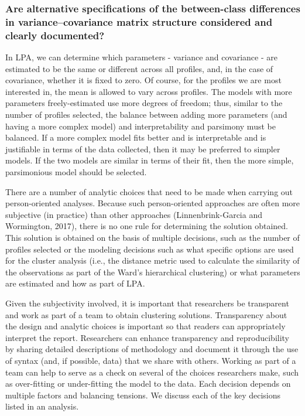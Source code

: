 \documentclass[man]{apa6}
\begin{document}
\hypertarget{are-alternative-specifications-of-the-between-class-differences-in-variancecovariance-matrix-structure-considered-and-clearly-documented}{%
\subsubsection{Are alternative specifications of the between-class differences in variance--covariance matrix structure considered and clearly documented?}\label{are-alternative-specifications-of-the-between-class-differences-in-variancecovariance-matrix-structure-considered-and-clearly-documented}}

In LPA, we can determine which parameters - variance
and covariance - are estimated to be the same or different across all profiles,
and, in the case of covariance, whether it is fixed to zero. Of course, for the
profiles we are most interested in, the mean is allowed to vary across profiles.
The models with more parameters freely-estimated use more degrees of freedom;
thus, similar to the number of profiles selected, the balance between adding
more parameters (and having a more complex model) and interpretability and
parsimony must be balanced. If a more complex model fits better and is
interpretable and is justifiable in terms of the data collected, then it may be
preferred to simpler models. If the two models are similar in terms of their
fit, then the more simple, parsimonious model should be selected.

There are a number of analytic choices that need to be made when carrying out
person-oriented analyses. Because such person-oriented approaches are often more
subjective (in practice) than other approaches (Linnenbrink-Garcia and
Wormington, 2017), there is no one rule for determining the solution obtained.
This solution is obtained on the basis of multiple decisions, such as the number
of profiles selected or the modeling decisions such as what specific options are
used for the cluster analysis (i.e., the distance metric used to calculate the
similarity of the observations as part of the Ward's hierarchical clustering) or
what parameters are estimated and how as part of LPA.

Given the subjectivity involved, it is important that researchers be transparent
and work as part of a team to obtain clustering solutions. Transparency about
the design and analytic choices is important so that readers can appropriately
interpret the report. Researchers can enhance transparency and reproducibility
by sharing detailed descriptions of methodology and document it through the use
of syntax (and, if possible, data) that we share with others. Working as part of
a team can help to serve as a check on several of the choices researchers make,
such as over-fitting or under-fitting the model to the data. Each decision
depends on multiple factors and balancing tensions. We discuss each of the key
decisions listed in an analysis.
\end{document}
